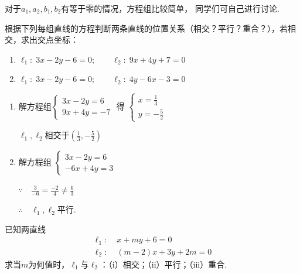 对于$a_1,a_2,b_1,b_2$有等于零的情况，方程组比较简单，
同学们可自己进行讨论.








\begin{example}
    根据下列每组直线的方程判断两条直线的位置关系（相交？平行？重合？），若相交，求出交点坐标：
\begin{enumerate}[(1)]
\item $\ell_1:\; 3x-2y-6=0;\qquad \ell_2:\; 9x+4y+7=0$
\item $\ell_1:\; 3x-2y-6=0;\qquad \ell_2:\; 4y-6x-3=0$
\end{enumerate}
\end{example}
 
\begin{solution}
\begin{enumerate}[(1)]
    \item 解方程组$\begin{cases}
        3x-2y=6\\ 9x+4y=-7
    \end{cases}$
得
$\begin{cases}
    x=\frac{1}{3}\\y=-\frac{5}{2}
\end{cases}$

$\ell_1,\ell_2$相交于$\left(\frac{1}{3},-\frac{5}{2}\right)$
\item 解方程组
$\begin{cases}
    3x-2y=6\\ -6x+4y=3
\end{cases}$

$\because\quad \frac{3}{-6}=\frac{-2}{4}\ne \frac{6}{3}$

$\therefore\quad \ell_1,\ell_2$平行.
\end{enumerate}
\end{solution}


\begin{example}
    已知两直线
\[\begin{split}
  \ell_1:&\; x+my+6=0\\
  \ell_2:&\; (m-2)x+3y+2m=0 
\end{split}\]
求当$m$为何值时，$\ell_1$与$\ell_2$：（i）相交；（ii）平行；（iii）重合.
\end{example}

